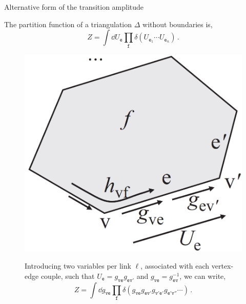 \documentclass[12pt,titlepage]{article}
\begin{document}
\begin{frame}{Alternative form of the transition amplitude}
    \begin{list}{\,}{\leftmargin=1em \itemindent=0em}
        \item<1-> The partition function of a triangulation $\Delta$ without boundaries is,
        \begin{equation}
            Z=\int\dd{U_\mathtt{e}}\prod_\mathtt{f}\delta(U_{\mathtt{e}_1}\cdots U_{\mathtt{e}_n})\,.
        \end{equation}
        \item<2-> \noindent\FloatBarrier
        \begin{figure}[!ht]
            \begin{minipage}{0.25\linewidth}
                \includegraphics[width=\linewidth]{4.12}
            \end{minipage}
            \begin{minipage}{0.75\linewidth}
                Introducing two variables per link $\ell$, associated with each vertex-edge couple, such that $U_\mathtt{e}=g_{\mathtt{ve}}g_{\mathtt{ev'}}$ and $g_{\mathtt{ve}}=g^{-1}_{\mathtt{ev}}$, we can write,
                \begin{equation}
                    Z=\int\dd{g_\mathtt{ve}}\prod_\mathtt{f}\delta(g_\mathtt{ve}g_\mathtt{ev'}g_\mathtt{v'e'}g_\mathtt{e'v''}\cdots)\,.
                \end{equation}

\end{minipage}
\end{figure}
\end{list}
\end{frame}
\end{document}
